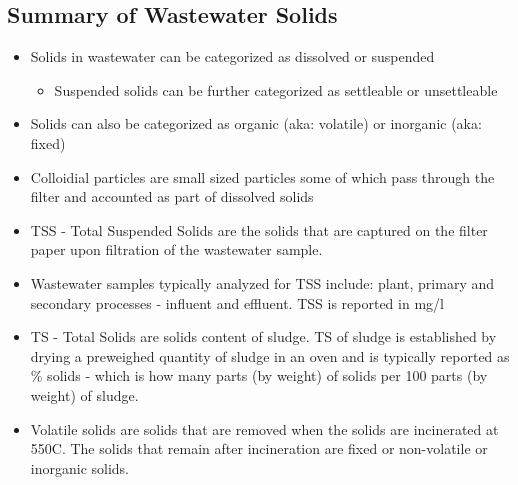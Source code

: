 	\subsection{Summary of Wastewater Solids}		
			\begin{itemize}
				\item Solids in wastewater can be categorized as dissolved or suspended
				      \begin{itemize}
				      	\item Suspended solids can be further categorized as settleable or unsettleable
				      \end{itemize}
				\item Solids can also be categorized as organic (aka: volatile) or inorganic (aka: fixed)
				\item Colloidial particles are small sized particles some of which pass through the filter and accounted as part of dissolved solids
				\item TSS - Total Suspended Solids are the solids that are captured on the filter paper upon filtration of the wastewater sample.  
				\item Wastewater samples typically analyzed for TSS include:  plant, primary and secondary processes - influent and effluent.  TSS is reported in mg/l
				\item TS - Total Solids are solids content of sludge.  TS of sludge is established by drying a preweighed quantity of sludge in an oven and is typically reported as \% solids - which is how many parts (by weight) of solids per 100 parts (by weight) of sludge.
				\item Volatile solids are solids that are removed when the solids are incinerated at 550C.  The solids that remain after incineration are fixed or non-volatile or inorganic solids.
			\end{itemize}
